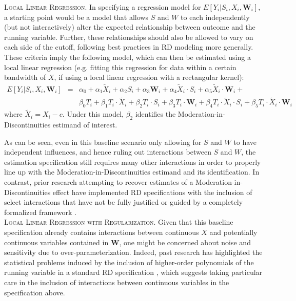 \documentclass[12pt]{article}
\begin{document}
\noindent \textsc{Local Linear Regression.} In specifying a regression model for $E[Y_i | S_i, X_i, \bm{W}_i]$, a starting point would be a model that allows $S$ and $W$ to each independently (but not interactively) alter the expected relationship between outcome and the running variable. Further, these relationships should also be allowed to vary on each side of the cutoff, following best practices in RD modeling more generally. These criteria imply the following model, which can then be estimated using a local linear regression (e.g. fitting this regression for data within a certain bandwidth of $X$, if using a local linear regression with a rectangular kernel):
\begin{eqnarray}
E[Y_i | S_i, X_i, \bm{W}_i] & = & \alpha_0 + \alpha_1 \tilde{X}_i + \alpha_2 S_i + \alpha_3 \bm{W}_i + \alpha_4 \tilde{X}_i \cdot S_i + \alpha_5 \tilde{X}_i \cdot \bm{W}_i + \label{mid_little_model} \\
& & \beta_0 T_i  + \beta_1 T_i \cdot \tilde{X}_i + \beta_2 T_i \cdot S_i + \beta_3 T_i \cdot \bm{W}_i + \beta_4 T_i \cdot \tilde{X}_i \cdot S_i + \beta_5 T_i \cdot \tilde{X}_i \cdot \bm{W}_i  \nonumber
\end{eqnarray}
where $\tilde{X}_i = X_i - c$. Under this model, $\beta_2$ identifies the Moderation-in-Discontinuities estimand of interest.

As can be seen, even in this baseline scenario only allowing for $S$ and $W$ to have independent influences, and hence ruling out interactions between $S$ and $W$, the estimation specification still requires many other interactions in order to properly line up with the Moderation-in-Discontinuities estimand and its identification. In contrast, prior research attempting to recover estimates of a Moderation-in-Discontinuities effect have implemented RD specifications with the inclusion of select interactions that have not be fully justified or guided by a completely formalized framework \cite[e.g.][]{bazzi2020institutional,olson2020,desai2021}. \\

\noindent \textsc{Local Linear Regression with Regularization.} Given that this baseline specification already contains interactions between continuous $X$ and potentially continuous variables contained in $\bm{W}$, one might be concerned about noise and sensitivity due to over-parameterization. Indeed, past research has highlighted the statistical problems induced by the inclusion of higher-order polynomials of the running variable in a standard RD specification \cite{gelman2019high}, which suggests taking particular care in the inclusion of interactions between continuous variables in the specification above.
\end{document}
